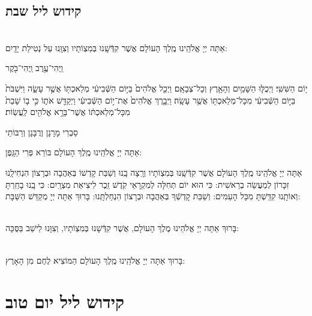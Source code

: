 \documentclass[twoside, openany, parskip=half, 11pt]{book}
\begin{document}
\section*{ קידוש ליל שבת }

\\
 אַתָּה יְיָ אֱלֹהֵֽינוּ מֶֽלֶךְ הָעוֹלָם אֲשֶׁר קִדְּֿשָֽׁנוּ בְּמִצְוֹתָיו וְצִוָּֽנוּ עַל נְטִילַת יָדָֽיִם: 


\begin{small}וַֽיְהִי־עֶ֥רֶב וַֽיְהִי־בֹ֖קֶר\end{small}
 י֥וֹם הַשִּׁשִּֽׁי׃ וַיְכֻלּ֛וּ הַשָּׁמַ֥יִם וְהָאָ֖רֶץ וְכָל־צְבָאָֽם׃ וַיְכַ֤ל אֱלֹהִים֙ בַּיּ֣וֹם הַשְּֿׁבִיעִ֔י מְלַאכְתּ֖וֹ אֲשֶׁ֣ר עָשָׂ֑ה וַיִּשְׁבֹּת֙ בַּיּ֣וֹם הַשְּֿׁבִיעִ֔י מִכָּל־מְלַאכְתּ֖וֹ אֲשֶׁ֥ר עָשָֽׂה׃ וַיְבָ֤רֶךְ אֱלֹהִים֙ אֶת־י֣וֹם הַשְּֿׁבִיעִ֔י וַיְקַדֵּ֖שׁ אֹת֑וֹ כִּ֣י ב֤וֹ שָׁבַת֙ מִכָּל־מְלַאכְתּ֔וֹ אֲשֶׁר־בָּרָ֥א אֱלֹהִ֖ים לַֽעֲשֽׂוֹת׃

\begin{footnotesize}
סַבְרִי מָרָנָן וְרֲבָּנָן וְרַבּוֹתַי\\
\end{footnotesize}
 אַתָּה יְיָ אֱלֹהֵֽינוּ מֶֽלֶךְ הָעוֹלָם בּוֹרֵא פְּרִי הַגָּֽפֶן:

 אַתָּה יְיָ אֱלֹהֵֽינוּ מֶֽלֶךְ הָעוֹלָם אֲשֶׁר קִדְּֿשָֽׁנוּ בְּמִצְוֹתָיו וְרָֽצָה בָֽנוּ וְשַׁבַּת קָדְשׁוֹ בְּאַהֲבָה וּבְרָצוֹן הִנְחִילָֽנוּ זִכָּרוֹן לְמַעֲשֵׂה בְרֵאשִׁית: כִּי הוּא יוֹם תְּחִלָּה לְמִקְרָאֵי קֹֽדֶשׁ זֵֽכֶר לִיצִיאַת מִצְרָֽיִם: כִּי בָֽנוּ בָחַֽרְתָּ וְאוֹתָֽנוּ קִדַּֽשְׁתָּ מִכָּל הָעַמִּים: וְשַׁבַּת קָדְשְֿׁךָ בְּאַהֲבָה וּבְרָצוֹן הִנְחַלְתָּֽנוּ: בָּרוּךְ אַתָּה יְיָ מְקַדֵּשׁ הַשַּׁבָּת:

\begin{sometimes}

\\
בָּרוּךְ אַתָּה יְיָ אֱלֹהֵינוּ מֶלֶךְ הָעוֹלָם, אֲשֶׁר קִדְּֿשָׁנוּ בְּמִצְוֹתָיו, וְצִוָּנוּ לֵישֵׁב בַּסֻּכָּה:

\end{sometimes}

\\
בָּרוּךְ אַתָּה יְיָ אֱלֹהֵֽינוּ מֶֽלֶךְ הָעוֹלָם הַמּוֹצִיא לֶחֶם מִן הָאָרֶץ:

\chapter[קידוש ליל יום טוב]{ קידוש ליל יום טוב }
\label{kiddush leil yom tov}
\end{document}
